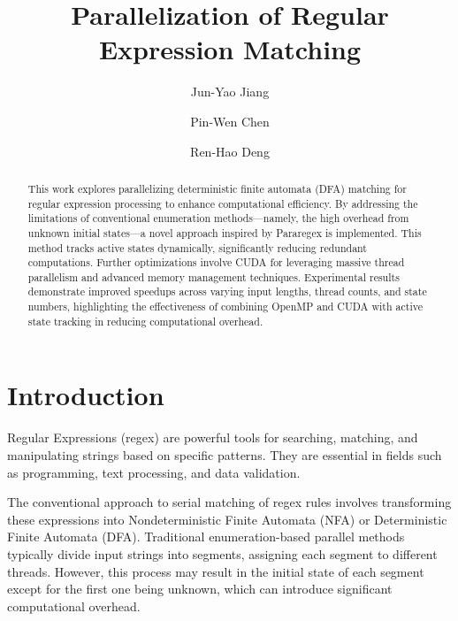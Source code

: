 \documentclass[sigconf]{acmart}
\begin{document}
\title{Parallelization of Regular Expression Matching}

\author{Jun-Yao Jiang}


\author{Pin-Wen Chen}
\authornotemark[1]


\author{Ren-Hao Deng}
\authornotemark[1]

\begin{abstract}
	This work explores parallelizing deterministic finite automata (DFA) matching for regular expression processing to enhance computational efficiency. By addressing the limitations of conventional enumeration methods—namely, the high overhead from unknown initial states—a novel approach inspired by Pararegex is implemented. This method tracks active states dynamically, significantly reducing redundant computations. Further optimizations involve CUDA for leveraging massive thread parallelism and advanced memory management techniques. Experimental results demonstrate improved speedups across varying input lengths, thread counts, and state numbers, highlighting the effectiveness of combining OpenMP and CUDA with active state tracking in reducing computational overhead.
\end{abstract}

\pagestyle{plain}
\maketitle

\section{Introduction}

Regular Expressions (regex) are powerful tools for searching, matching, and manipulating strings based on specific patterns. They are essential in fields such as programming, text processing, and data validation.

The conventional approach to serial matching of regex rules involves transforming these expressions into Nondeterministic Finite Automata (NFA) or Deterministic Finite Automata (DFA). Traditional enumeration-based parallel methods typically divide input strings into segments, assigning each segment to different threads. However, this process may result in the initial state of each segment except for the first one being unknown, which can introduce significant computational overhead.
\end{document}
